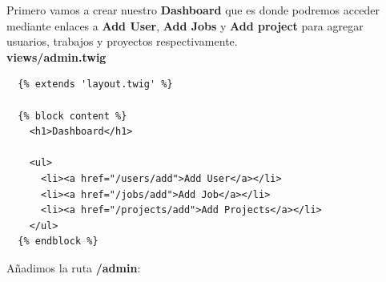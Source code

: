 \documentclass{article}
\begin{document}
Primero vamos a crear nuestro \textbf{Dashboard} que es donde podremos acceder
mediante enlaces a \textbf{Add User}, \textbf{Add Jobs} y \textbf{Add project}
para agregar usuarios, trabajos y proyectos respectivamente.\\

\textbf{views/admin.twig}
\begin{verbatim}
  {% extends 'layout.twig' %}

  {% block content %}
    <h1>Dashboard</h1>

    <ul>
      <li><a href="/users/add">Add User</a></li>
      <li><a href="/jobs/add">Add Job</a></li>
      <li><a href="/projects/add">Add Projects</a></li>
    </ul>
  {% endblock %}
\end{verbatim}

Añadimos la ruta \textbf{/admin}:\\
\end{document}
